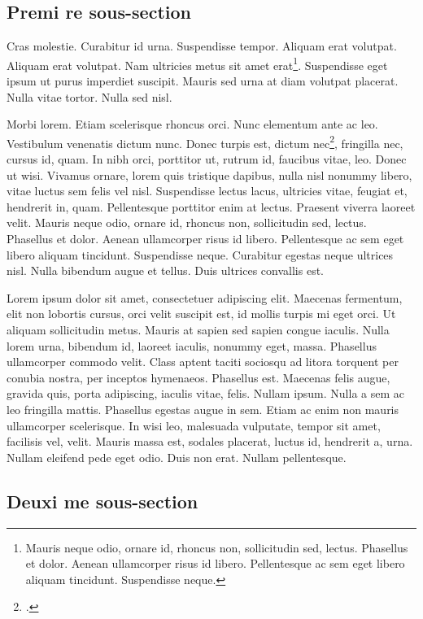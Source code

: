 \documentclass{article}
\begin{document}
\subsection{Premi re sous-section}

Cras molestie. Curabitur id urna. Suspendisse tempor. Aliquam erat volutpat. Aliquam erat volutpat. Nam ultricies metus sit amet erat\footnote{Mauris neque odio, ornare id, rhoncus non, sollicitudin sed, lectus. Phasellus et dolor. Aenean ullamcorper risus id libero. Pellentesque ac sem eget libero aliquam tincidunt. Suspendisse neque.}. Suspendisse eget ipsum ut purus imperdiet suscipit. Mauris sed urna at diam volutpat placerat. Nulla vitae tortor. Nulla sed nisl.

Morbi lorem. Etiam scelerisque rhoncus orci. Nunc elementum ante ac leo. Vestibulum venenatis dictum nunc. Donec turpis est, dictum nec\footcite[228]{Drocher2006}, fringilla nec, cursus id, quam. In nibh orci, porttitor ut, rutrum id, faucibus vitae, leo. Donec ut wisi. Vivamus ornare, lorem quis tristique dapibus, nulla nisl nonummy libero, vitae luctus sem felis vel nisl. Suspendisse lectus lacus, ultricies vitae, feugiat et, hendrerit in, quam. Pellentesque porttitor enim at lectus. Praesent viverra laoreet velit. Mauris neque odio, ornare id, rhoncus non, sollicitudin sed, lectus. Phasellus et dolor. Aenean ullamcorper risus id libero. Pellentesque ac sem eget libero aliquam tincidunt. Suspendisse neque. Curabitur egestas neque ultrices nisl. Nulla bibendum augue et tellus. Duis ultrices convallis est.

Lorem ipsum dolor sit amet, consectetuer adipiscing elit. Maecenas fermentum, elit non lobortis cursus, orci velit suscipit est, id mollis turpis mi eget orci. Ut aliquam sollicitudin metus. Mauris at sapien sed sapien congue iaculis. Nulla lorem urna, bibendum id, laoreet iaculis, nonummy eget, massa. Phasellus ullamcorper commodo velit. Class aptent taciti sociosqu ad litora torquent per conubia nostra, per inceptos hymenaeos. Phasellus est. Maecenas felis augue, gravida quis, porta adipiscing, iaculis vitae, felis. Nullam ipsum. Nulla a sem ac leo fringilla mattis. Phasellus egestas augue in sem. Etiam ac enim non mauris ullamcorper scelerisque. In wisi leo, malesuada vulputate, tempor sit amet, facilisis vel, velit. Mauris massa est, sodales placerat, luctus id, hendrerit a, urna. Nullam eleifend pede eget odio. Duis non erat. Nullam pellentesque.


\subsection{Deuxi me sous-section}
\end{document}
